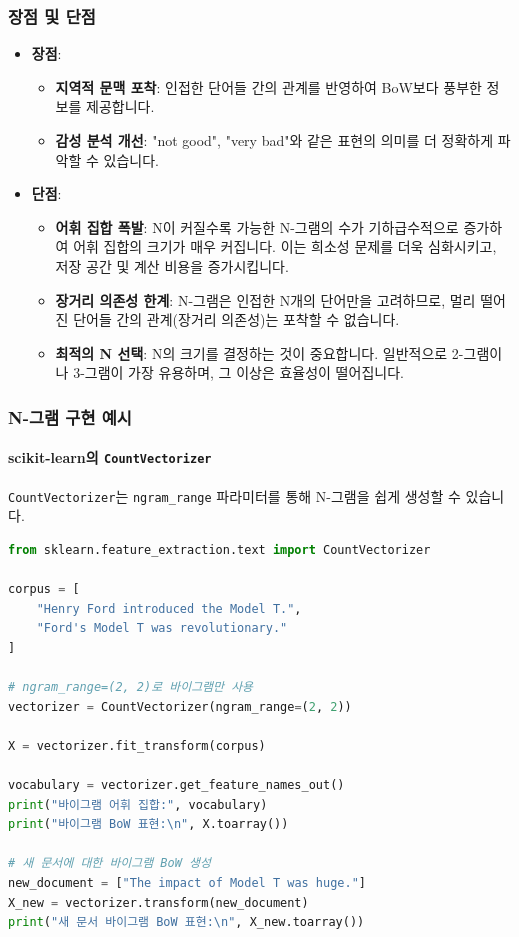 \documentclass[11pt,a4paper]{article}
\begin{document}
\subsubsection{장점 및 단점}
\begin{itemize}
    \item \textbf{장점}:
        \begin{itemize}
            \item \textbf{지역적 문맥 포착}: 인접한 단어들 간의 관계를 반영하여 BoW보다 풍부한 정보를 제공합니다.
            \item \textbf{감성 분석 개선}: "not good", "very bad"와 같은 표현의 의미를 더 정확하게 파악할 수 있습니다.
        \end{itemize}
    \item \textbf{단점}:
        \begin{itemize}
            \item \textbf{어휘 집합 폭발}: N이 커질수록 가능한 N-그램의 수가 기하급수적으로 증가하여 어휘 집합의 크기가 매우 커집니다. 이는 희소성 문제를 더욱 심화시키고, 저장 공간 및 계산 비용을 증가시킵니다.
            \item \textbf{장거리 의존성 한계}: N-그램은 인접한 N개의 단어만을 고려하므로, 멀리 떨어진 단어들 간의 관계(장거리 의존성)는 포착할 수 없습니다.
            \item \textbf{최적의 N 선택}: N의 크기를 결정하는 것이 중요합니다. 일반적으로 2-그램이나 3-그램이 가장 유용하며, 그 이상은 효율성이 떨어집니다.
        \end{itemize}
\end{itemize}

\subsubsection{N-그램 구현 예시}

\paragraph{scikit-learn의 \texttt{CountVectorizer}}
\texttt{CountVectorizer}는 \texttt{ngram\_range} 파라미터를 통해 N-그램을 쉽게 생성할 수 있습니다.

\begin{lstlisting}[language=Python, caption={scikit-learn CountVectorizer를 이용한 N-그램 생성}, label=lst:sklearn_ngram]
from sklearn.feature_extraction.text import CountVectorizer

corpus = [
    "Henry Ford introduced the Model T.",
    "Ford's Model T was revolutionary."
]

# ngram_range=(2, 2)로 바이그램만 사용
vectorizer = CountVectorizer(ngram_range=(2, 2))

X = vectorizer.fit_transform(corpus)

vocabulary = vectorizer.get_feature_names_out()
print("바이그램 어휘 집합:", vocabulary)
print("바이그램 BoW 표현:\n", X.toarray())

# 새 문서에 대한 바이그램 BoW 생성
new_document = ["The impact of Model T was huge."]
X_new = vectorizer.transform(new_document)
print("새 문서 바이그램 BoW 표현:\n", X_new.toarray())
\end{lstlisting}
\end{document}
